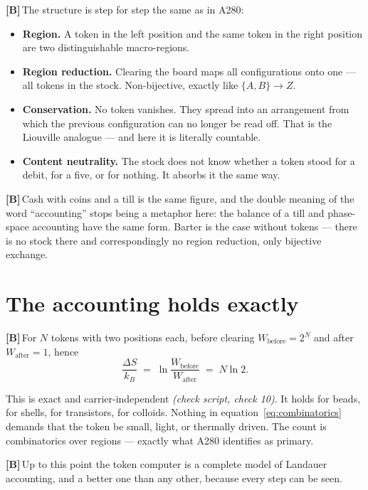 \documentclass[11pt,a4paper]{article}
\newcommand{\LB}{\textcolor{layB}{\textbf{\footnotesize\textsf{[B]}}}\,}
\newcommand{\pruef}[1]{{\small\itshape(check script, #1)}}
\begin{document}
\LB The structure is step for step the same as in A280:

\begin{itemize}[leftmargin=1.4em,itemsep=0.3em]
  \item \textbf{Region.} A token in the left position and the same token in the
        right position are two distinguishable macro-regions.
  \item \textbf{Region reduction.} Clearing the board maps all configurations onto
        one --- all tokens in the stock. Non-bijective, exactly like
        $\{A,B\}\to Z$.
  \item \textbf{Conservation.} No token vanishes. They spread into an arrangement
        from which the previous configuration can no longer be read off. That is
        the Liouville analogue --- and here it is literally countable.
  \item \textbf{Content neutrality.} The stock does not know whether a token stood
        for a debit, for a five, or for nothing. It absorbs it the same way.
\end{itemize}

\LB Cash with coins and a till is the same figure, and the double meaning of the
word “accounting” stops being a metaphor here: the balance of a till and
phase-space accounting have the same form. Barter is the case without tokens ---
there is no stock there and correspondingly no region reduction, only bijective
exchange.

\section{The accounting holds exactly}

\LB For $N$ tokens with two positions each, before clearing
$W_{\text{before}} = 2^N$ and after $W_{\text{after}} = 1$, hence
\begin{equation}
  \frac{\Delta S}{k_B} \;=\; \ln\frac{W_{\text{before}}}{W_{\text{after}}}
  \;=\; N \ln 2 .
  \label{eq:combinatorics}
\end{equation}

This is exact and carrier-independent \pruef{check 10}. It holds for beads, for
shells, for transistors, for colloids. Nothing in
equation~\eqref{eq:combinatorics} demands that the token be small, light, or
thermally driven. The count is combinatorics over regions --- exactly what A280
identifies as primary.

\LB Up to this point the token computer is a complete model of Landauer
accounting, and a better one than any other, because every step can be seen.
\end{document}
